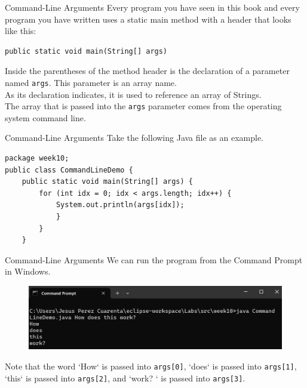 \documentclass[11pt]{beamer}
\begin{document}
\begin{frame}[fragile]
{Command-Line Arguments}
    Every program you have seen in this book and every program you have written uses a static main method with a header that looks like this:
    \begin{lstlisting}
public static void main(String[] args)
    \end{lstlisting}
    Inside the parentheses of the method header is the declaration of a parameter named \texttt{args}. This parameter is an array name. \\ \vspace{1em}
    As its declaration indicates, it is used to reference an array of Strings. \\ \vspace{1em}
    The array that is passed into the \texttt{args} parameter comes from the operating system command line.
\end{frame}

\begin{frame}[fragile]
{Command-Line Arguments}
Take the following Java file as an example.
    \begin{lstlisting}
package week10;
public class CommandLineDemo {
	public static void main(String[] args) {
		for (int idx = 0; idx < args.length; idx++) {
			System.out.println(args[idx]);
			}
		}
	}
    \end{lstlisting}
\end{frame}

\begin{frame}[fragile]
{Command-Line Arguments}
We can run the program from the Command Prompt in Windows.
    \noindent 
    \begin{figure}[H]
    \centering
    \includegraphics[scale=0.6]{Images/chapter07_section12_cmdArgs.png}
    \end{figure}
    Note that the word `How` is passed into \texttt{args[0]}, `does` is passed into \texttt{args[1]}, `this` is passed into \texttt{args[2]}, and `work? ` is passed into \texttt{args[3]}.
\end{frame}
\end{document}
